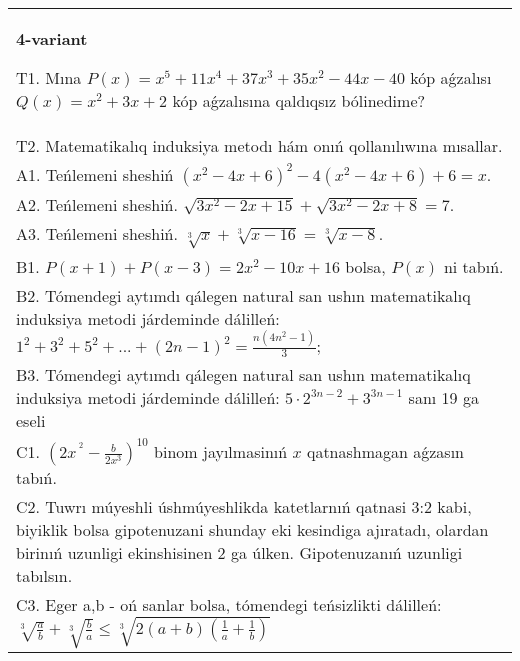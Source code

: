 \documentclass{article}
\begin{document}
\begin{tabular}{m{17cm}}
\textbf{4-variant}
\newline

T1. Mına \(P(x) = x^{5} + 11x^{4} + 37x^{3} + 35x^{2} - 44x - 40\) kóp aǵzalısı \(Q(x) = x^{2} + 3x + 2\) kóp aǵzalısına qaldıqsız bólinedime? \\
T2. Matematikalıq induksiya metodı hám onıń qollanılıwına mısallar. \\
A1. Teńlemeni sheshiń \(\left( x^{2} - 4x + 6 \right)^{2} - 4\left( x^{2} - 4x + 6 \right) + 6 = x\). \\
A2. Teńlemeni sheshiń. \(\sqrt{3x^{2} - 2x + 15} + \sqrt{3x^{2} - 2x + 8} = 7\). \\
A3. Teńlemeni sheshiń. \(\sqrt[3]{x} + \sqrt[3]{x - 16} = \sqrt[3]{x - 8}\). \\
B1. \(P(x + 1) + P(x - 3) = 2x^{2} - 10x + 16\) bolsa, \(P(x)\) ni tabıń. \\
B2. Tómendegi aytımdı qálegen natural san ushın matematikalıq induksiya metodi járdeminde dálilleń: \(1^{2} + 3^{2} + 5^{2} + ... + (2n - 1)^{2} = \frac{n\left( 4n^{2} - 1 \right)}{3}\); \\
B3. Tómendegi aytımdı qálegen natural san ushın matematikalıq induksiya metodi járdeminde dálilleń: \(5 \cdot 2^{3n - 2} + 3^{3n - 1}\) sanı 19 ga eseli \\
C1. \(\left( 2x^{\ ^{2}} - \frac{b}{2x^{3}} \right)^{10}\) binom jayılmasinıń \(x\) qatnashmagan aǵzasın tabıń. \\
C2. Tuwrı múyeshli úshmúyeshlikda katetlarnıń qatnasi 3:2 kabi, biyiklik bolsa gipotenuzani shunday eki kesindiga ajıratadı, olardan birinıń uzunligi ekinshisinen 2 ga úlken. Gipotenuzanıń uzunligi tabılsın. \\
C3. Eger a,b - oń sanlar bolsa, tómendegi teńsizlikti dálilleń: \(\sqrt[3]{\frac{a}{b}} + \sqrt[3]{\frac{b}{a}} \leq \sqrt[3]{2(a + b)\left( \frac{1}{a} + \frac{1}{b} \right)}\) \\

\end{tabular}
\vspace{1cm}
\end{document}
